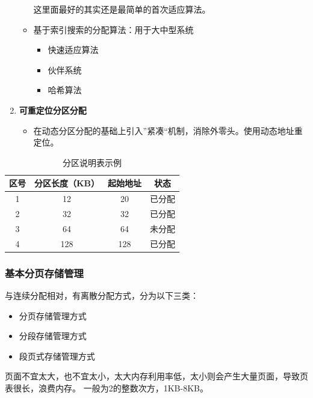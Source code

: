 \documentclass[12pt, a4paper, oneside]{ctexart}
\begin{document}
\begin{enumerate}
\begin{itemize}
    这里面最好的其实还是最简单的首次适应算法。

    \item 基于索引搜索的分配算法：用于大中型系统
    \begin{itemize}
      \item 快速适应算法
      \item 伙伴系统
      \item 哈希算法
    \end{itemize}
  \end{itemize}
  \item {\bf 可重定位分区分配}
  \begin{itemize}
    \item 在动态分区分配的基础上引入”紧凑“机制，消除外零头。使用动态地址重定位。
  \end{itemize}
\end{enumerate}

\begin{table}[!ht]
  \centering
  \caption{分区说明表示例}
  \label{area_table_example}
  \begin{tabular}{|c|c|c|c|}
  \hline
    \textbf{区号} & \textbf{分区长度（KB）} & \textbf{起始地址} & \textbf{状态} \\ \hline
    1 & 12 & 20 & 已分配 \\ \hline
    2 & 32 & 32 & 已分配 \\ \hline
    3 & 64 & 64 & 未分配 \\ \hline
    4 & 128 & 128 & 已分配 \\ \hline
  \end{tabular}
\end{table}

\subsubsection{基本分页存储管理}

与连续分配相对，有离散分配方式，分为以下三类：
\begin{itemize}
  \item 分页存储管理方式
  \item 分段存储管理方式
  \item 段页式存储管理方式
\end{itemize}

页面不宜太大，也不宜太小，太大内存利用率低，太小则会产生大量页面，导致页表很长，浪费内存。
一般为2的整数次方，1KB-8KB。
\end{document}
